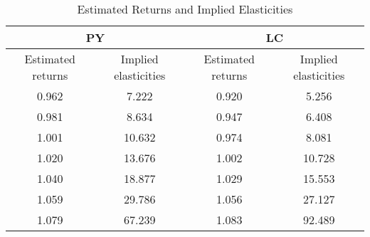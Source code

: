 \begin{table}[!htbp]
\centering
\caption{Estimated Returns and Implied Elasticities}
\label{tab:returns_uniform}
\begin{tabular}{|c|c|c|c|}
\hline
\multicolumn{2}{|c|}{PY} & \multicolumn{2}{|c|}{LC} \\
\hline
Estimated returns & Implied elasticities & Estimated returns & Implied elasticities \\
\hline
0.962 & 7.222 & 0.920 & 5.256 \\
0.981 & 8.634 & 0.947 & 6.408 \\
1.001 & 10.632 & 0.974 & 8.081 \\
1.020 & 13.676 & 1.002 & 10.728 \\
1.040 & 18.877 & 1.029 & 15.553 \\
1.059 & 29.786 & 1.056 & 27.127 \\
1.079 & 67.239 & 1.083 & 92.489 \\
\hline
\end{tabular}
\end{table}
